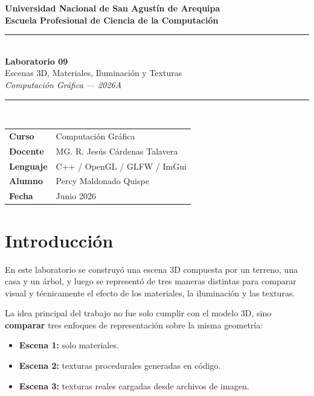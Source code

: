 \documentclass[12pt,a4paper]{article}
\begin{document}
\begin{titlepage}
\centering\vspace*{1cm}
{\Large\bfseries\color{unsa-blue}
  Universidad Nacional de San Agustín de Arequipa\\[0.3em]
  Escuela Profesional de Ciencia de la Computación}\\[2em]
\rule{\linewidth}{1.5pt}\\[0.8em]
{\LARGE\bfseries Laboratorio 09}\\[0.4em]
{\large Escenas 3D, Materiales, Iluminación y Texturas}\\[0.3em]
{\large\itshape Computación Gráfica — 2026A}\\[0.4em]
\rule{\linewidth}{1.5pt}\\[2em]
\begin{tabular}{ll}
  \textbf{Curso}    & Computación Gráfica \\[0.3em]
  \textbf{Docente}  & MG. R. Jesús Cárdenas Talavera \\[0.3em]
  \textbf{Lenguaje} & C++ / OpenGL / GLFW / ImGui \\[0.3em]
  \textbf{Alumno}   & Percy Maldonado Quispe \\[0.3em]
  \textbf{Fecha}    & Junio 2026 \\
\end{tabular}
\vfill
\end{titlepage}

\tableofcontents\newpage

\section{Introducción}

En este laboratorio se construyó una escena 3D compuesta por un terreno, una
casa y un árbol, y luego se representó de tres maneras distintas para comparar
visual y técnicamente el efecto de los materiales, la iluminación y las
texturas.

La idea principal del trabajo no fue solo cumplir con el modelo 3D, sino
\textbf{comparar} tres enfoques de representación sobre la misma geometría:

\begin{itemize}[noitemsep]
  \item \textbf{Escena 1:} solo materiales.
  \item \textbf{Escena 2:} texturas procedurales generadas en código.
  \item \textbf{Escena 3:} texturas reales cargadas desde archivos de imagen.
\end{itemize}
\end{document}

